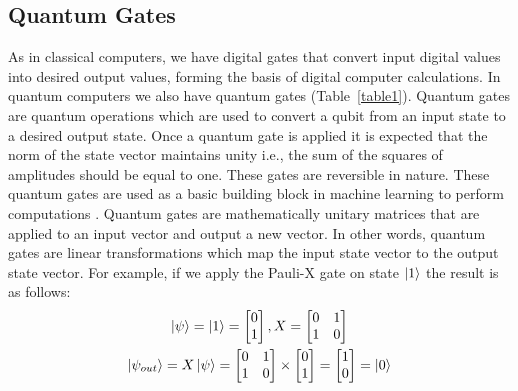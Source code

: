 \documentclass[conference]{IEEEtran}
\begin{document}
\subsection{Quantum Gates}
As in classical computers, we have digital gates that convert input digital values into desired output values, forming the basis of digital computer calculations. In quantum computers we also have quantum gates (Table~\ref{table1}). Quantum gates are quantum operations which are used to convert a qubit from an input state to a desired output state. Once a quantum gate is applied it is expected that the norm of the state vector maintains unity i.e., the sum of the squares of amplitudes should be equal to one. These gates are reversible in nature. These quantum gates are used as a basic building block in machine learning to perform computations \cite{b19}. Quantum gates are mathematically unitary matrices that are applied to an input vector and output a new vector. In other words, quantum gates are linear transformations which map the input state vector to the output state vector. For example, if we apply the Pauli-X gate on state $\ket{1}$ the result is as follows:
\begin{gather}
	\ket{\psi} = \ket{1} = \begin{bmatrix}
		0 \\
		1
	\end{bmatrix}, X = \begin{bmatrix}
	0 & 1 \\
	1 & 0
	\end{bmatrix} \\
	\ket{\psi_{out}} = X\ket{\psi} = \begin{bmatrix}
		0 & 1 \\
		1 & 0
	\end{bmatrix} \times \begin{bmatrix}
	0 \\
	1
	\end{bmatrix} = \begin{bmatrix}
	1 \\
	0
	\end{bmatrix} = \ket{0}
\end{gather}
\end{document}
